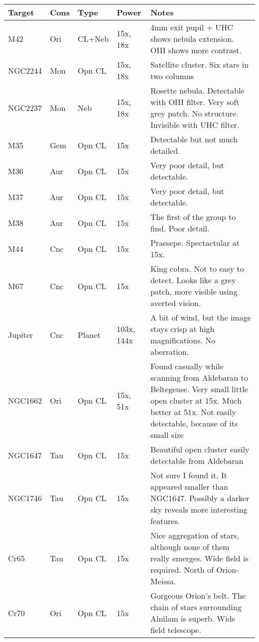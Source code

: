 \begin{longtable}{ p{0.7in}  p{0.3in}  p{0.6in}  p{0.9in}  p{5.8in} }
\hline 
{\bf Target} & {\bf Cons} & {\bf Type} & {\bf Power} & {\bf Notes} \\ 
\hline 
M42 & Ori & CL+Neb & 15x, 18x & 4mm exit pupil + UHC shows nebula extension. OIII shows more contrast. \\ 
NGC2244 & Mon & Opn CL & 15x, 18x & Satellite cluster. Six stars in two columns  \\ 
NGC2237 & Mon & Neb & 15x, 18x & Rosette nebula. Detectable with OIII filter. Very soft grey patch. No structure. Invisible with UHC filter. \\ 
M35 & Gem & Opn CL & 15x & Detectable but not much detailed. \\ 
M36 & Aur & Opn CL & 15x & Very poor detail, but detectable.  \\ 
M37 & Aur & Opn CL & 15x & Very poor detail, but detectable.  \\ 
M38 & Aur & Opn CL & 15x & The first of the group to find. Poor detail. \\ 
M44 & Cnc & Opn CL & 15x & Praesepe. Spectactular at 15x. \\ 
M67 & Cnc & Opn CL & 15x & King cobra. Not to easy to detect. Looks like a grey patch, more visible using averted vision. \\ 
Jupiter & Cnc & Planet & 103x, 144x & A bit of wind, but the image stays crisp at high magnifications. No aberration. \\ 
NGC1662 & Ori & Opn CL & 15x, 51x & Found casually while scanning from Aldebaran to Beltegeuse. Very small little open cluster at 15x. Much better at 51x. Not easily detectable, because of its small size \\ 
NGC1647 & Tau & Opn CL & 15x  & Beautiful open cluster easily detectable from Aldebaran \\ 
NGC1746 & Tau & Opn CL & 15x & Not sure I found it. It appeared smaller than NGC1647. Possibly a darker sky reveals more interesting features. \\ 
Cr65 & Tau & Opn CL & 15x & Nice aggregation of stars, although none of them really emerges. Wide field is required. North of Orion-Meissa. \\ 
Cr70 & Ori & Opn CL & 15x & Gorgeous Orion's belt. The chain of stars surrounding Alnilam is superb. Wide field telescope. \\ 
\hline 
\end{longtable} 
